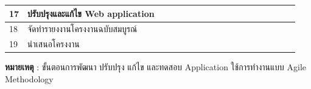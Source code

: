 \documentclass[12pt,oneside,openright,a4paper]{cpe-thai-project}
\begin{document}
\begin{table}[h]
{\begin{tabular}{|llllllllllllllllll|}
\multicolumn{1}{|l|}{17}                    & \multicolumn{1}{l|}{ปรับปรุงและแก้ไข Web application}                                     & \multicolumn{1}{l|}{\cellcolor[HTML]{2D8C9F}} & \multicolumn{1}{l|}{\cellcolor[HTML]{2D8C9F}} & \multicolumn{1}{l|}{\cellcolor[HTML]{2D8C9F}} & \multicolumn{1}{l|}{\cellcolor[HTML]{2D8C9F}} & \multicolumn{1}{l|}{\cellcolor[HTML]{2D8C9F}} & \multicolumn{1}{l|}{\cellcolor[HTML]{2D8C9F}} & \multicolumn{1}{l|}{\cellcolor[HTML]{2D8C9F}} & \multicolumn{1}{l|}{\cellcolor[HTML]{2D8C9F}} & \multicolumn{1}{l|}{\cellcolor[HTML]{2D8C9F}} & \multicolumn{1}{l|}{\cellcolor[HTML]{2D8C9F}} & \multicolumn{1}{l|}{\cellcolor[HTML]{2D8C9F}} & \multicolumn{1}{l|}{\cellcolor[HTML]{2D8C9F}} & \multicolumn{1}{l|}{\cellcolor[HTML]{2D8C9F}} & \multicolumn{1}{l|}{\cellcolor[HTML]{2D8C9F}} & \multicolumn{1}{l|}{\cellcolor[HTML]{2D8C9F}} & \cellcolor[HTML]{2D8C9F} \\ \hline
\multicolumn{1}{|l|}{18}                    & \multicolumn{1}{l|}{จัดทำรายงงานโครงงานฉบับสมบูรณ์}                                       & \multicolumn{1}{l|}{}                         & \multicolumn{1}{l|}{}                         & \multicolumn{1}{l|}{}                         & \multicolumn{1}{l|}{}                         & \multicolumn{1}{l|}{}                         & \multicolumn{1}{l|}{}                         & \multicolumn{1}{l|}{}                         & \multicolumn{1}{l|}{}                         & \multicolumn{1}{l|}{\cellcolor[HTML]{2D8C9F}} & \multicolumn{1}{l|}{\cellcolor[HTML]{2D8C9F}} & \multicolumn{1}{l|}{\cellcolor[HTML]{2D8C9F}} & \multicolumn{1}{l|}{\cellcolor[HTML]{2D8C9F}} & \multicolumn{1}{l|}{\cellcolor[HTML]{2D8C9F}} & \multicolumn{1}{l|}{\cellcolor[HTML]{2D8C9F}} & \multicolumn{1}{l|}{\cellcolor[HTML]{2D8C9F}} & \cellcolor[HTML]{2D8C9F} \\ \hline
\multicolumn{1}{|l|}{19}                    & \multicolumn{1}{l|}{นำเสนอโครงงาน}                                                        & \multicolumn{1}{l|}{}                         & \multicolumn{1}{l|}{}                         & \multicolumn{1}{l|}{}                         & \multicolumn{1}{l|}{}                         & \multicolumn{1}{l|}{}                         & \multicolumn{1}{l|}{}                         & \multicolumn{1}{l|}{}                         & \multicolumn{1}{l|}{}                         & \multicolumn{1}{l|}{}                         & \multicolumn{1}{l|}{}                         & \multicolumn{1}{l|}{}                         & \multicolumn{1}{l|}{}                         & \multicolumn{1}{l|}{}                         & \multicolumn{1}{l|}{}                         & \multicolumn{1}{l|}{}                         & \cellcolor[HTML]{2D8C9F} \\ \hline
\end{tabular}
}
\end{table}
\FloatBarrier
\textbf{หมายเหตุ} : ขั้นตอนการพัฒนา ปรับปรุง แก้ไข และทดสอบ Application ใช้การทำงานแบบ Agile Methodology
\clearpage
\end{document}
